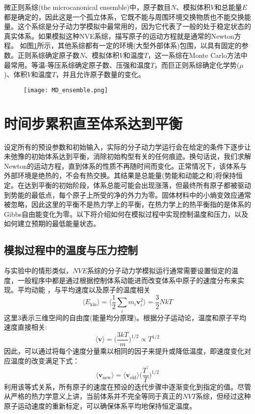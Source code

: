 微正则系综\textrm{(the microcanonical ensemble)}中，原子数目$N$、模拟体积$V$和总能量$E$都是确定的，因此这是一个孤立体系，它既不能与周围环境交换物质也不能交换能量。这个系综是分子动力学模拟中最常用的，因为它代表了一般的处于稳定状态的真实体系。如果模拟这种NVE系综，描写原子的运动方程就是通常的\textrm{Newton}方程。
如图\ref{MD_ensemble}所示，其他系综都有一定的环境(大型外部体系)包围，以具有固定的参数。正则系综确定原子数$N$、模拟体积$V$和温度$T$，这一系综在\textrm{Monte Carlo}方法中最常用。等温-等压系综确定原子数、压强$和$温度$T$，而巨正则系综确定化学势($\mu$)、体积$V$和温度$T$，并且允许原子数量的变化。
\begin{figure}[h!]
\centering
\vspace*{-0.1in}
\texttt{[image: MD\_ensemble.png]}
\caption{\fontsize{7.2pt}{4.2pt}}%
\label{MD_ensemble}
\end{figure}

\section{时间步累积直至体系达到平衡}
设定所有的预设参数和初始输入，实际的分子动力学运行会在给定的条件下逐步让未弛豫的初始体系达到平衡，消除初始构型有关的任何痕迹。换句话说，我们求解\textrm{Newton}的运动方程，直到体系的性质不再随时间而变化。正常情况下，该体系与外部环境是绝热的，不会有热交换。其结果是总能量(势能和动能之和)将保持恒定。在达到平衡的初始阶段，体系总能可能会出现涨落，但最终所有原子都被驱动到势能的最低点，每个原子上所受的净的外力为零。固体材料中的小熵变效应通常被忽略，因此这里的平衡不是热力学上的平衡，在热力学上的热平衡指的是体系的\textrm{Gibbs}自由能变化为零。以下将介绍如何在模拟过程中实现控制温度和压力，以及如何建立预期的最低能量状态。
\subsection{模拟过程中的温度与压力控制}
与实验中的情形类似，$NVE$系综的分子动力学模拟运行通常需要设置恒定的温度，一般程序中都是通过根据控制体系动能进而改变体系中原子的速度分布来实现。平均动能 ，与平均速度以及原子的温度相关
\begin{equation}
	\langle E_{\mathrm{kin}}\rangle=\bigg\langle\dfrac12\sum_im_i\mathbf{v}_i^2\bigg\rangle=\dfrac32NkT
	\label{eq:MD_molecular_kinetic}
\end{equation}
这里3表示三维空间的自由度(能量均分原理)。根据分子运动论，温度和原子平均速度直接相关:
\begin{displaymath}
	\langle\mathbf{v}\rangle=\bigg(\dfrac{3kT}m\bigg)^{1/2}\propto T^{1/2}
\end{displaymath} 
因此，可以通过将每个速度分量乘以相同的因子来提升或降低温度，即速度变化对应温度的改变满足下式：
\begin{equation}
	\langle\mathbf{v}_{\mathrm{new}}\rangle=\langle\mathbf{v}_{\mathrm{old}}\rangle\bigg(\dfrac{T^{\prime}}T\bigg)^{1/2}
	\label{eq:MD_velocity_relation}
\end{equation}
利用该等式关系，所有原子的速度在预设的迭代步骤中逐渐变化到指定的值。尽管从严格的热力学意义上讲，当前体系并不完全等同于真正的$NVT$系综，但经过这种原子运动速度的重新标定，可以确保体系平均地保持恒定温度。

